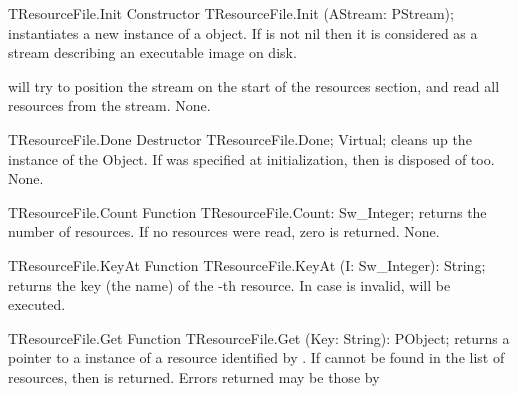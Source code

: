 \begin{procedure}{TResourceFile.Init}
\Declaration
Constructor TResourceFile.Init (AStream: PStream);
\Description
{} instantiates a new instance of a  object.
If  is not nil then it is considered as a stream describing an
executable image on disk. 

 will try to position the stream on the start of the resources section,
and read all resources from the stream.
\Errors
None.
\SeeAlso
{}
\end{procedure}

\begin{procedure}{TResourceFile.Done}
\Declaration
Destructor TResourceFile.Done; Virtual;
\Description
{} cleans up the instance of the  Object. 
If  was specified at initialization, then  is 
disposed of too.
\Errors
None.
\SeeAlso
{}
\end{procedure}

\begin{function}{TResourceFile.Count}
\Declaration
Function TResourceFile.Count: Sw\_Integer;
\Description
{} returns the number of resources. If no resources were
read, zero is returned.
\Errors
None.
\SeeAlso
{}
\end{function}

\begin{function}{TResourceFile.KeyAt}
\Declaration
Function TResourceFile.KeyAt (I: Sw\_Integer): String;
\Description
{} returns the key (the name) of the -th resource.
\Errors
In case  is invalid,  will be executed.
\SeeAlso
{}
\end{function}

\begin{function}{TResourceFile.Get}
\Declaration
Function TResourceFile.Get (Key: String): PObject;
\Description
{} returns a pointer to a instance of a resource identified by
. If  cannot be found in the list of resources, then
 is returned.
\Errors
Errors returned may be those by 
\SeeAlso
\end{function}

